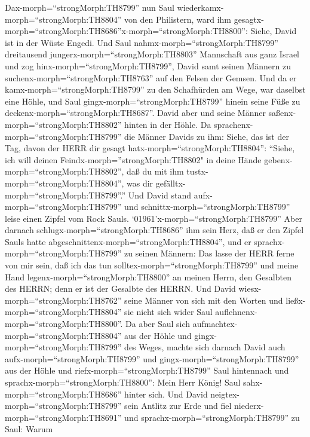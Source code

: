  Dax-morph=``strongMorph:TH8799'' nun Saul
wiederkamx-morph=``strongMorph:TH8804'' von den Philistern, ward ihm
gesagtx-morph=``strongMorph:TH8686''x-morph=``strongMorph:TH8800'':
Siehe, David ist in der Wüste Engedi.  Und Saul
nahmx-morph=``strongMorph:TH8799'' dreitausend
jungerx-morph=``strongMorph:TH8803'' Mannschaft aus ganz Israel und zog
hinx-morph=``strongMorph:TH8799'', David samt seinen Männern zu
suchenx-morph=``strongMorph:TH8763'' auf den Felsen der Gemsen.
 Und da er kamx-morph=``strongMorph:TH8799'' zu den
Schafhürden am Wege, war daselbst eine Höhle, und Saul
gingx-morph=``strongMorph:TH8799'' hinein seine Füße zu
deckenx-morph=``strongMorph:TH8687''. David aber und seine Männer
saßenx-morph=``strongMorph:TH8802'' hinten in der Höhle.  Da
sprachenx-morph=``strongMorph:TH8799'' die Männer Davids zu ihm: Siehe,
das ist der Tag, davon der HERR dir gesagt
hatx-morph=``strongMorph:TH8804'': ``Siehe, ich will deinen
Feindx-morph=''strongMorph:TH8802" in deine Hände
gebenx-morph=``strongMorph:TH8802'', daß du mit ihm
tustx-morph=``strongMorph:TH8804'', was dir
gefälltx-morph=``strongMorph:TH8799''.'' Und David stand
aufx-morph=``strongMorph:TH8799'' und
schnittx-morph=``strongMorph:TH8799'' leise einen Zipfel vom Rock Sauls.
 `01961'\textbar x-morph=``strongMorph:TH8799'' Aber darnach
schlugx-morph=``strongMorph:TH8686'' ihm sein Herz, daß er den Zipfel
Sauls hatte abgeschnittenx-morph=``strongMorph:TH8804'', 
und er sprachx-morph=``strongMorph:TH8799'' zu seinen Männern: Das lasse
der HERR ferne von mir sein, daß ich das tun
solltex-morph=``strongMorph:TH8799'' und meine Hand
legenx-morph=``strongMorph:TH8800'' an meinen Herrn, den Gesalbten des
HERRN; denn er ist der Gesalbte des HERRN.  Und David
wiesx-morph=``strongMorph:TH8762'' seine Männer von sich mit den Worten
und ließx-morph=``strongMorph:TH8804'' sie nicht sich wider Saul
auflehnenx-morph=``strongMorph:TH8800''. Da aber Saul sich
aufmachtex-morph=``strongMorph:TH8804'' aus der Höhle und
gingx-morph=``strongMorph:TH8799'' des Weges,  machte sich
darnach David auch aufx-morph=``strongMorph:TH8799'' und
gingx-morph=``strongMorph:TH8799'' aus der Höhle und
riefx-morph=``strongMorph:TH8799'' Saul hintennach und
sprachx-morph=``strongMorph:TH8800'': Mein Herr König! Saul
sahx-morph=``strongMorph:TH8686'' hinter sich. Und David
neigtex-morph=``strongMorph:TH8799'' sein Antlitz zur Erde und fiel
niederx-morph=``strongMorph:TH8691''  und
sprachx-morph=``strongMorph:TH8799'' zu Saul: Warum
